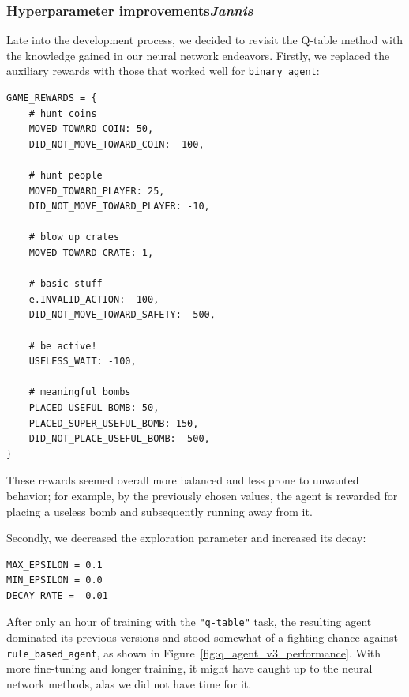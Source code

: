 \documentclass{article}
\begin{document}
\subsubsection[Hyperparameter improvements]{Hyperparameter improvements{\normalsize \normalfont \it \hfill Jannis}}

Late into the development process, we decided to revisit the Q-table method with the knowledge gained in our neural network endeavors. Firstly, we replaced the auxiliary rewards with those that worked well for \texttt{binary\_agent}:

\begin{verbatim}
GAME_REWARDS = {
    # hunt coins
    MOVED_TOWARD_COIN: 50,
    DID_NOT_MOVE_TOWARD_COIN: -100,

    # hunt people
    MOVED_TOWARD_PLAYER: 25,
    DID_NOT_MOVE_TOWARD_PLAYER: -10,

    # blow up crates
    MOVED_TOWARD_CRATE: 1,

    # basic stuff
    e.INVALID_ACTION: -100,
    DID_NOT_MOVE_TOWARD_SAFETY: -500,

    # be active!
    USELESS_WAIT: -100,

    # meaningful bombs
    PLACED_USEFUL_BOMB: 50,
    PLACED_SUPER_USEFUL_BOMB: 150,
    DID_NOT_PLACE_USEFUL_BOMB: -500,
}
\end{verbatim}

These rewards seemed overall more balanced and less prone to unwanted behavior; for example, by the previously chosen values, the agent is rewarded for placing a useless bomb and subsequently running away from it.\par
Secondly, we decreased the exploration parameter and increased its decay:

\begin{verbatim}
MAX_EPSILON = 0.1
MIN_EPSILON = 0.0
DECAY_RATE =  0.01
\end{verbatim}

After only an hour of training with the \texttt{"q-table"} task, the resulting agent dominated its previous versions and stood somewhat of a fighting chance against \texttt{rule\_based\_agent}, as shown in Figure~\ref{fig:q_agent_v3_performance}. With more fine-tuning and longer training, it might have caught up to the neural network methods, alas we did not have time for it.
\end{document}
